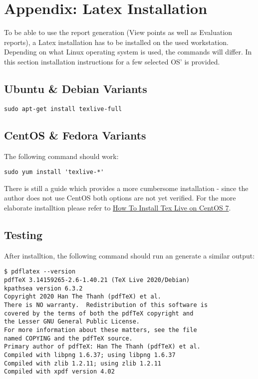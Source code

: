 \section{Appendix: Latex Installation}
\label{sec:appendix_latex}  

To be able to use the report generation (View points as well as Evaluation reports), a Latex installation has to be installed on the used workstation. \\

Depending on what Linux operating system is used, the commands will differ. In this section installation instructions for a few selected OS' is provided.

\subsection {Ubuntu \& Debian Variants}

\begin{lstlisting}
sudo apt-get install texlive-full 
\end{lstlisting}

\subsection {CentOS \& Fedora Variants}

The following command should work:

\begin{lstlisting}
sudo yum install 'texlive-*'
\end{lstlisting}

There is still a guide which provides a more cumbersome installation - since the author does not use CentOS both options are not yet verified. For the more elaborate installtion please refer to \href{https://www.systutorials.com/how-to-install-tex-live-on-centos-7-linux/}{How To Install Tex Live on CentOS 7}.

\subsection{Testing}

After installtion, the following command should run an generate a similar output:

\begin{lstlisting}
$ pdflatex --version
pdfTeX 3.14159265-2.6-1.40.21 (TeX Live 2020/Debian)
kpathsea version 6.3.2
Copyright 2020 Han The Thanh (pdfTeX) et al.
There is NO warranty.  Redistribution of this software is
covered by the terms of both the pdfTeX copyright and
the Lesser GNU General Public License.
For more information about these matters, see the file
named COPYING and the pdfTeX source.
Primary author of pdfTeX: Han The Thanh (pdfTeX) et al.
Compiled with libpng 1.6.37; using libpng 1.6.37
Compiled with zlib 1.2.11; using zlib 1.2.11
Compiled with xpdf version 4.02
\end{lstlisting}

